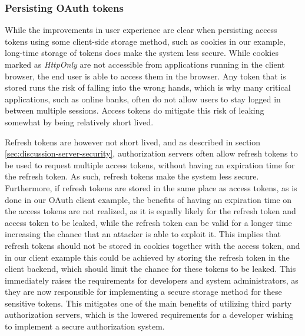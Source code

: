 \subsubsection{Persisting OAuth tokens}
While the improvements in user experience are clear when persisting access tokens using some client-side storage method, such as cookies in our example, long-time storage of tokens does make the system less secure.
While cookies marked as \textit{HttpOnly} are not accessible from applications running in the client browser, the end user is able to access them in the browser.
Any token that is stored runs the risk of falling into the wrong hands, which is why many critical applications, such as online banks, often do not allow users to stay logged in between multiple sessions.
Access tokens do mitigate this risk of leaking somewhat by being relatively short lived.

Refresh tokens are however not short lived, and as described in section \ref{sec:discussion-server-security}, authorization servers often allow refresh tokens to be used to request multiple access tokens, without having an expiration time for the refresh token.
As such, refresh tokens make the system less secure.
Furthermore, if refresh tokens are stored in the same place as access tokens, as is done in our OAuth client example, the benefits of having an expiration time on the access tokens are not realized, as it is equally likely for the refresh token and access token to be leaked, while the refresh token can be valid for a longer time increasing the chance that an attacker is able to exploit it.
This implies that refresh tokens should not be stored in cookies together with the access token, and in our client example this could be achieved by storing the refresh token in the client backend, which should limit the chance for these tokens to be leaked.
This immediately raises the requirements for developers and system administrators, as they are now responsible for implementing a secure storage method for these sensitive tokens.
This mitigates one of the main benefits of utilizing third party authorization servers, which is the lowered requirements for a developer wishing to implement a secure authorization system.
